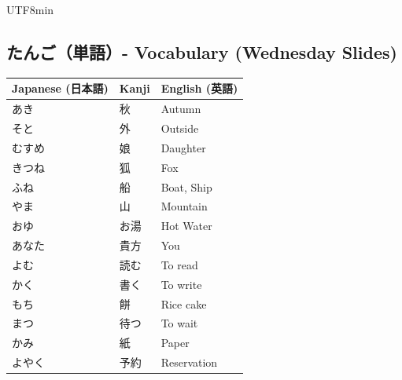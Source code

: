 \documentclass[11pt]{article}
\begin{document}
\begin{CJK}{UTF8}{min}
\subsection{たんご（単語）- Vocabulary (Wednesday Slides)}
\begin{tabularx}{\textwidth}{X | X | X}
    \toprule
    \textbf{Japanese (日本語)} & \textbf{Kanji} & \textbf{English (英語)} \\
    \midrule
    あき & 秋 & Autumn \\
    そと & 外 & Outside \\
    むすめ & 娘 & Daughter \\
    きつね & 狐 & Fox \\
    ふね & 船 & Boat, Ship \\
    やま & 山 & Mountain \\
    おゆ & お湯 & Hot Water \\
    あなた & 貴方 & You \\
    よむ & 読む & To read \\
    かく & 書く & To write \\
    もち & 餅 & Rice cake \\
    まつ & 待つ & To wait \\
    かみ & 紙 & Paper \\
    よやく & 予約 & Reservation \\
    \bottomrule
\end{tabularx}


\end{CJK}
\end{document}
